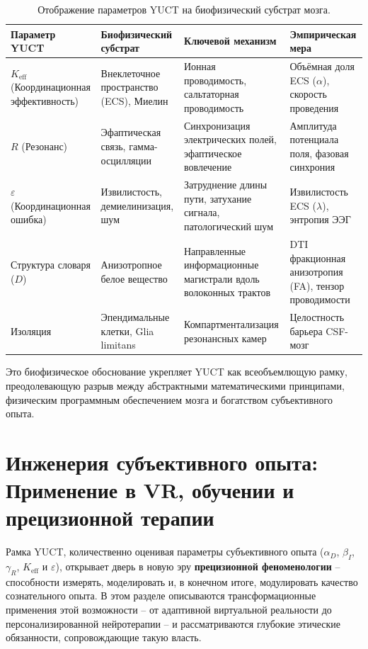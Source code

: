 \documentclass[12pt,a4paper]{article}
\begin{document}
	\begin{table}[H]
		\centering
		\caption{Отображение параметров YUCT на биофизический субстрат мозга.}
		\label{tab:biophysical-mapping}
		\small
		\begin{tabular}{p{3cm} p{4cm} p{5cm} p{3cm}}
			\toprule
			\textbf{Параметр YUCT} & \textbf{Биофизический субстрат} & \textbf{Ключевой механизм} & \textbf{Эмпирическая мера} \\
			\midrule
			\(K_{\mathrm{eff}}\) (Координационная эффективность) & Внеклеточное пространство (ECS), Миелин & Ионная проводимость, сальтаторная проводимость & Объёмная доля ECS (\(\alpha\)), скорость проведения \\
			\(R\) (Резонанс) & Эфаптическая связь, гамма-осцилляции & Синхронизация электрических полей, эфаптическое вовлечение & Амплитуда потенциала поля, фазовая синхрония \\
			\(\varepsilon\) (Координационная ошибка) & Извилистость, демиелинизация, шум & Затруднение длины пути, затухание сигнала, патологический шум & Извилистость ECS (\(\lambda\)), энтропия ЭЭГ \\
			Структура словаря (\(D\)) & Анизотропное белое вещество & Направленные информационные магистрали вдоль волоконных трактов & DTI фракционная анизотропия (FA), тензор проводимости \\
			Изоляция & Эпендимальные клетки, Glia limitans & Компартментализация резонансных камер & Целостность барьера CSF-мозг \\
			\bottomrule
		\end{tabular}
	\end{table}
	
	Это биофизическое обоснование укрепляет YUCT как всеобъемлющую рамку, преодолевающую разрыв между абстрактными математическими принципами, физическим программным обеспечением мозга и богатством субъективного опыта.
	
	\section{Инженерия субъективного опыта: Применение в VR, обучении и прецизионной терапии}
	
	Рамка YUCT, количественно оценивая параметры субъективного опыта (\(\alpha_D\), \(\beta_I\), \(\gamma_R\), \(K_{\mathrm{eff}}\) и \(\varepsilon\)), открывает дверь в новую эру \textbf{прецизионной феноменологии} – способности измерять, моделировать и, в конечном итоге, модулировать качество сознательного опыта. В этом разделе описываются трансформационные применения этой возможности – от адаптивной виртуальной реальности до персонализированной нейротерапии – и рассматриваются глубокие этические обязанности, сопровождающие такую власть.
	
\end{document}
